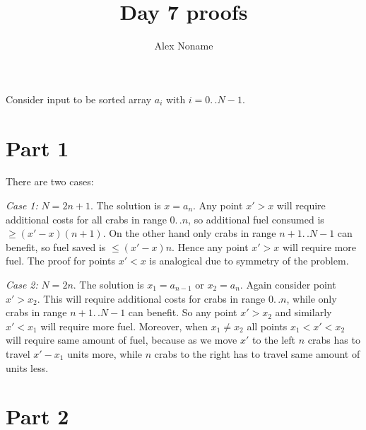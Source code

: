 \documentclass[a4paper,11pt]{article}
\title{Day 7 proofs}
\author{Alex Noname}
\newcommand{\dotss}{ \mathrel{{.}\,{.}} }
\begin{document}
\maketitle

Consider input to be sorted array $a_i$ with $i=0 \dotss N-1$.

\section*{Part 1}

There are two cases:

\textit{Case 1:} $N=2 n + 1$. The solution is $x=a_n$. 
Any point $x'>x$ will require additional costs for all crabs in range $0 \dotss n$, 
so additional fuel consumed is $\geq (x'-x) (n + 1)$.
On the other hand only crabs in range $n + 1 \dotss N-1$ can benefit,
so fuel saved is $\leq (x'-x) n$.
Hence any point $x'>x$ will require more fuel.
The proof for points $x'<x$ is analogical due to symmetry of the problem.

\textit{Case 2:} $N=2n$. The solution is $x_1=a_{n-1}$ or $x_2=a_{n}$.
Again consider point $x'>x_2$. This will require additional costs for crabs in range $0 \dotss n$,
while only crabs in range $n+1 \dotss N-1$ can benefit.
So any point $x'>x_2$ and similarly $x'<x_1$ will require more fuel.
Moreover, when $x_1 \neq x_2$ all points $x_1 < x' < x_2$ will require same amount of fuel,
because as we move $x'$ to the left $n$ crabs has to travel $x'-x_1$ units more, 
while $n$ crabs to the right has to travel same amount of units less.

\section*{Part 2}
\end{document}
